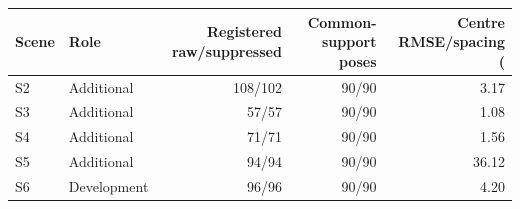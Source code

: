 \begin{tabular}{llrrr}
\toprule
Scene & Role & Registered raw/suppressed & Common-support poses & Centre RMSE/spacing (\\%
\midrule
S2 & Additional & 108/102 & 90/90 & 3.17 \\
S3 & Additional & 57/57 & 90/90 & 1.08 \\
S4 & Additional & 71/71 & 90/90 & 1.56 \\
S5 & Additional & 94/94 & 90/90 & 36.12 \\
S6 & Development & 96/96 & 90/90 & 4.20 \\
\bottomrule
\end{tabular}
